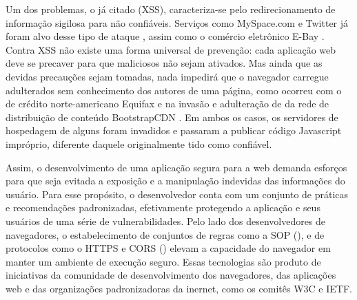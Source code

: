 Um dos problemas, o já citado  (XSS), caracteriza-se pelo redirecionamento de informação sigilosa para  não confiáveis. Serviços como MySpace.com e Twitter já foram alvo desse tipo de ataque \cite{IBM2017}, assim como o comércio eletrônico E-Bay \cite{Vanunu2016}. Contra XSS não existe uma forma universal de prevenção: cada aplicação web deve se precaver para que {\scripts} maliciosos não sejam ativados. Mas ainda que as devidas precauções sejam tomadas, nada impedirá que o navegador carregue {\scripts} adulterados sem conhecimento dos autores de uma página, como ocorreu com o  de crédito norte-americano Equifax \cite{Segura2017} e na invasão e adulteração de {\scripts} da rede de distribuição de conteúdo BootstrapCDN \cite{Dorfman2013}. Em ambos os casos, os servidores de hospedagem de alguns {\scripts} foram invadidos e passaram a publicar código Javascript impróprio, diferente daquele originalmente tido como confiável. %

Assim, o desenvolvimento de uma aplicação segura para a web demanda esforços para que seja evitada a exposição e a manipulação indevidas das informações do usuário. Para esse propósito, o desenvolvedor conta com um conjunto de práticas e recomendações padronizadas, efetivamente protegendo a aplicação e seus usuários de uma série de vulnerabilidades. Pelo lado dos desenvolvedores de navegadores, o estabelecimento de conjuntos de regras como a SOP (), e de protocolos como o HTTPS e CORS () elevam a capacidade do navegador em manter um ambiente de execução seguro. Essas tecnologias são produto de iniciativas da comunidade de desenvolvimento dos navegadores, das aplicações web e das organizações padronizadoras da inernet, como os comitês W3C e IETF. %

